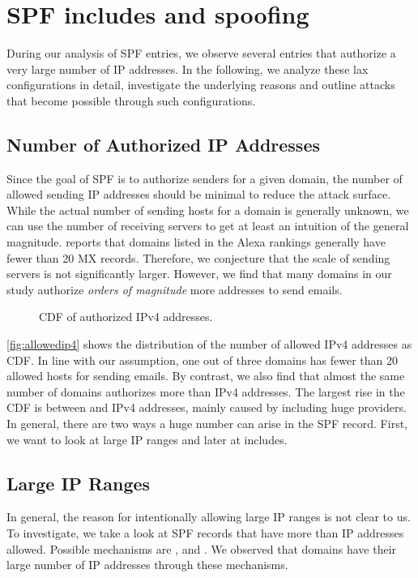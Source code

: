 \section{SPF includes and spoofing}
\label{sec:includes}

During our analysis of \ac{SPF} entries, we observe several entries that authorize a very large number of IP addresses. In the following, we analyze these lax configurations in detail, investigate the underlying reasons and outline attacks that become possible through such configurations.

\subsection{Number of Authorized IP Addresses}
Since the goal of \ac{SPF} is to authorize senders for a given domain, the number of allowed sending IP addresses should be minimal to reduce the attack surface.
While the actual number of sending hosts for a domain is generally unknown, we can use the number of receiving servers to get at least an intuition of the general magnitude.
\citet{Ruohonen2020} reports that domains listed in the Alexa rankings generally have fewer than 20 MX records.
Therefore, we conjecture that the scale of sending servers is not significantly larger.
However, we find that many domains in our study authorize \emph{orders of magnitude} more addresses to send emails.

\begin{figure}[htbp]
	\centerline{}
	\vspace{-6pt}
	\caption{CDF of authorized IPv4 addresses.}
	\label{fig:allowedip4}
\end{figure}

\autoref{fig:allowedip4} shows the distribution of the number of allowed IPv4 addresses as \ac{CDF}.
In line with our assumption, one out of three domains has fewer than 20 allowed hosts for sending emails.
By contrast, we also find that almost the same number of domains authorizes more than  IPv4 addresses.
The largest rise in the \ac{CDF} is between  and  IPv4 addresses, mainly caused by including huge providers.
In general, there are two ways a huge number can arise in the SPF record.
First, we want to look at large IP ranges and later at includes. 

\subsection{Large IP Ranges}
\label{sec:huge_cidr}
In general, the reason for intentionally allowing large IP ranges is not clear to us.
To investigate, we take a look at SPF records that have more than  IP addresses allowed.
Possible mechanisms are ,  and .
We observed that \numprint{\HugeNoIncludeDomains} domains have their large number of IP addresses through these mechanisms.

